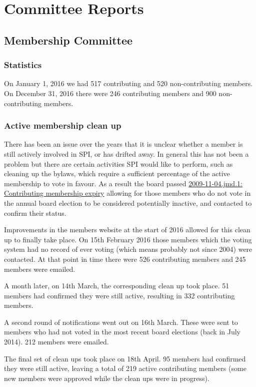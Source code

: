 \documentclass[letterpaper]{report}
\begin{document}
\chapter{Committee Reports}
\section{Membership Committee}

\subsection{Statistics}

On January 1, 2016 we had 517 contributing and 520 non-contributing members.
On December 31, 2016 there were 246 contributing members and 900 non-contributing
members.

\subsection{Active membership clean up}

There has been an issue over the years that it is unclear whether a member is still actively involved in SPI, or has drifted away. In general this has not been a problem but there are certain activities SPI would like to perform, such as cleaning up the bylaws, which require a sufficient percentage of the active membership to vote in favour. As a result the board passed \href{http://spi-inc.org/corporate/resolutions/2009/2009-11-04.jmd.1/}{2009-11-04.jmd.1: Contributing membership expiry} allowing for those members who do not vote in the annual board election to be considered potentially inactive, and contacted to confirm their status.

Improvements in the members website at the start of 2016 allowed for this clean up to finally take place. On 15th February 2016 those members which the voting system had no record of ever voting (which means probably not since 2004) were contacted. At that point in time there were 526 contributing members and 245 members were emailed.

A month later, on 14th March, the corresponding clean up took place. 51 members had confirmed they were still active, resulting in 332 contributing members.

A second round of notifications went out on 16th March. These were sent to members who had not voted in the most recent board elections (back in July 2014). 212 members were emailed.

The final set of clean ups took place on 18th April. 95 members had confirmed they were still active, leaving a total of 219 active contributing members (some new members were approved while the clean ups were in progress).
\end{document}
